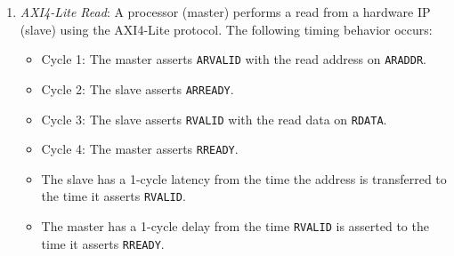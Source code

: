\documentclass[11pt]{article}
\begin{document}
\begin{enumerate}
\begin{enumerate}[label=(\alph*)] 
    \item On which cycle is the address transferred on the AW channel?
    \item On which cycle is the data transferred on the W channel? 
    \item On which cycle is \texttt{BVALID} asserted by the slave? 
    \item On which cycle is \texttt{BREADY} asserted by the master? 
    \item For each channel separately, on which cycle can the master first de-assert: 
    \texttt{AWVALID} and \texttt{WVALID}? 
    \item For each channel separately, on which cycle can the master first assert 
    \texttt{AWVALID} and \texttt{WVALID} for the \emph{next} write transaction? 
    If the master wants to start the next write with both \texttt{AWVALID} and 
    \texttt{WVALID} high in the same cycle, what is the earliest such cycle? 
\end{enumerate}

\begin{solution}
Enter your solutions here.
\end{solution}



\item {} \emph{AXI4-Lite Read}:  
A processor (master) performs a read from a hardware IP (slave) using the AXI4-Lite protocol.  
The following timing behavior occurs:

\begin{itemize}
  \item Cycle 1: The master asserts \texttt{ARVALID} with the read address on \texttt{ARADDR}.
  \item Cycle 2: The slave asserts \texttt{ARREADY}.
  \item Cycle 3: The slave asserts \texttt{RVALID} with the read data on \texttt{RDATA}.
  \item Cycle 4: The master asserts \texttt{RREADY}.
  \item The slave has a 1-cycle latency from the time the address is transferred to the time it asserts \texttt{RVALID}.
  \item The master has a 1-cycle delay from the time \texttt{RVALID} is asserted to the time it asserts \texttt{RREADY}.
\end{itemize}


\end{enumerate}
\end{document}
